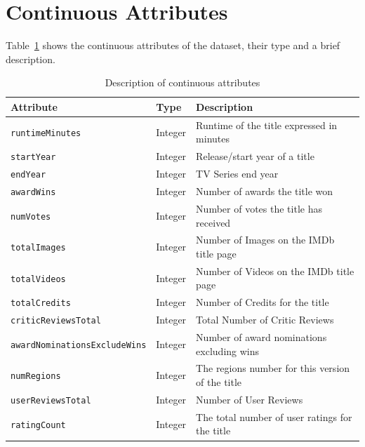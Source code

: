 \section{Continuous Attributes}
Table~\ref{tab:numerical_attributes} shows the continuous attributes of the dataset, their type and
a brief description.
\vspace{1em}
\begin{table}[h]
    \centering             
    

    \begin{tabular}{|l|l|l|} 
        \hline
        \textbf{Attribute} & \textbf{Type} & \textbf{Description} \\
        \hline
        \texttt{runtimeMinutes} & Integer & Runtime of the title expressed in minutes \\ 
        \hline
        \texttt{startYear} & Integer & Release/start year of a title \\ 
        \hline
        \texttt{endYear} & Integer & TV Series end year \\
        \hline
        \texttt{awardWins} & Integer & Number of awards the title won \\ 
        \hline
        \texttt{numVotes} & Integer & Number of votes the title has received \\ 
        \hline
        \texttt{totalImages} & Integer & Number of Images on the IMDb title page \\ 
        \hline
        \texttt{totalVideos} & Integer & Number of Videos on the IMDb title page \\ 
        \hline
        \texttt{totalCredits} & Integer & Number of Credits for the title \\ 
        \hline
        \texttt{criticReviewsTotal} & Integer & Total Number of Critic Reviews \\ 
        \hline
        \texttt{awardNominationsExcludeWins} & Integer & Number of award nominations excluding wins \\ 
        \hline
        \texttt{numRegions} & Integer & The regions number for this version of the title \\ 
        \hline
        \texttt{userReviewsTotal} & Integer & Number of User Reviews \\ 
        \hline
        \texttt{ratingCount} & Integer & The total number of user ratings for the title \\ 
        \hline
    \end{tabular}
    \caption{Description of continuous attributes}
    \label{tab:numerical_attributes}
\end{table}

